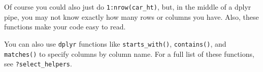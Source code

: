 \documentclass[]{article}
\newenvironment{Shaded}{\begin{snugshade}}{\end{snugshade}}
\newcommand{\KeywordTok}[1]{\textcolor[rgb]{0.13,0.29,0.53}{\textbf{#1}}}
\newcommand{\NormalTok}[1]{#1}
\newcommand{\OperatorTok}[1]{\textcolor[rgb]{0.81,0.36,0.00}{\textbf{#1}}}
\newcommand{\StringTok}[1]{\textcolor[rgb]{0.31,0.60,0.02}{#1}}
\begin{document}
\FloatBarrier

Of course you could also just do \texttt{1:nrow(car\_ht)}, but, in the
middle of a dplyr pipe, you may not know exactly how many rows or
columns you have. Also, these functions make your code easy to read.

You can also use \texttt{dplyr} functions like \texttt{starts\_with()},
\texttt{contains()}, and \texttt{matches()} to specify columns by column
name. For a full list of these functions, see \texttt{?select\_helpers}.

\begin{Shaded}
\end{Shaded}
\end{document}

